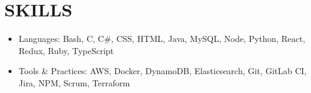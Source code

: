 \section{SKILLS}
\begin{itemize}
   \setlength\itemsep{-0.25em}
   \item{Languages: Bash, C, C\#, CSS, HTML, Java, MySQL, Node, Python, React, Redux, Ruby, TypeScript}
   \item{Tools \& Practices: AWS, Docker, DynamoDB, Elasticsearch, Git, GitLab CI, Jira, NPM, Scrum, Terraform}
\end{itemize}
